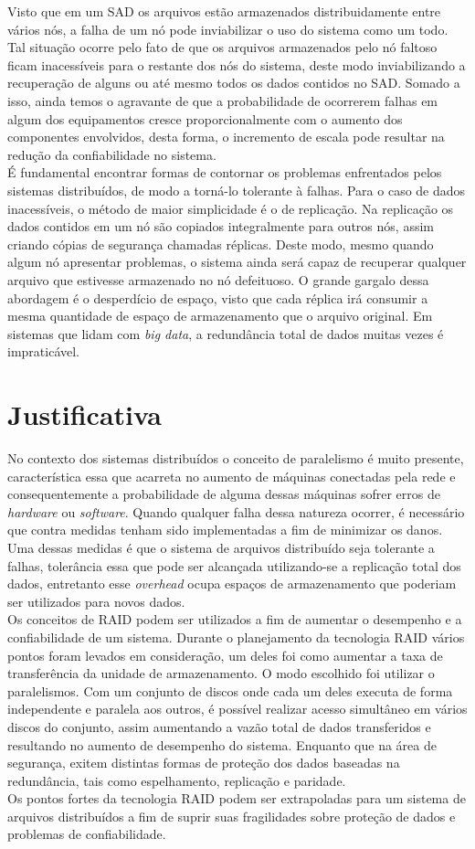	Visto que em um SAD os arquivos estão armazenados distribuidamente entre vários nós, a falha de um nó pode inviabilizar o uso do sistema como um todo. Tal situação ocorre pelo fato de que os arquivos armazenados pelo nó faltoso ficam inacessíveis para o restante dos nós do sistema, deste modo inviabilizando a recuperação de alguns ou até mesmo todos os dados contidos no SAD. Somado a isso, ainda temos o agravante de que a probabilidade de ocorrerem falhas em algum dos equipamentos cresce proporcionalmente com o aumento dos componentes envolvidos, desta forma, o incremento de escala pode resultar na redução da confiabilidade no sistema.
	\\
	
	É fundamental encontrar formas de contornar os problemas enfrentados pelos sistemas distribuídos, de modo a torná-lo tolerante à falhas. Para o caso de dados inacessíveis, o método de maior simplicidade é o de replicação. Na replicação os dados contidos em um nó são copiados integralmente para outros nós, assim criando cópias de segurança chamadas réplicas. Deste modo, mesmo quando algum nó apresentar problemas, o sistema ainda será capaz de recuperar qualquer arquivo que estivesse armazenado no nó defeituoso. O grande gargalo dessa abordagem é o desperdício de espaço, visto que cada réplica irá consumir a mesma quantidade de espaço de armazenamento que o arquivo original. Em sistemas que lidam com \textit{big data}, a redundância total de dados muitas vezes é impraticável.
	\\
		
	\section{Justificativa}
	No contexto dos sistemas distribuídos o conceito de paralelismo é muito presente, característica essa que acarreta no aumento de máquinas conectadas pela rede e consequentemente a probabilidade de alguma dessas máquinas sofrer erros de \textit{hardware} ou \textit{software}. Quando qualquer falha dessa natureza ocorrer, é necessário que contra medidas tenham sido implementadas a fim de minimizar os danos. Uma dessas medidas é que o sistema de arquivos distribuído seja tolerante a falhas, tolerância essa que pode ser alcançada utilizando-se a replicação total dos dados, entretanto esse \textit{overhead} ocupa espaços de armazenamento que poderiam ser utilizados para novos dados.
	\\
	
	Os conceitos de RAID podem ser utilizados a fim de aumentar o desempenho e a confiabilidade de um sistema. Durante o planejamento da tecnologia RAID vários pontos foram levados em consideração, um deles foi como aumentar a taxa de transferência da unidade de armazenamento. O modo escolhido foi utilizar o paralelismos. Com um conjunto de discos onde cada um deles executa de forma independente e paralela aos outros, é possível realizar acesso simultâneo em vários discos do conjunto, assim aumentando a vazão total de dados transferidos e resultando no aumento de desempenho do sistema. Enquanto que na área de segurança, exitem distintas formas de proteção dos dados baseadas na redundância, tais como espelhamento, replicação e paridade.
	\\
	
	Os pontos fortes da tecnologia RAID podem ser extrapoladas para um sistema de arquivos distribuídos a fim de suprir suas fragilidades sobre proteção de dados e problemas de confiabilidade.
	\\
